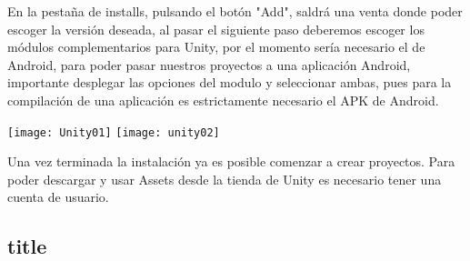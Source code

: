En la pestaña de installs, pulsando el botón "Add", saldrá una venta donde poder escoger la versión deseada, al pasar el siguiente paso deberemos escoger los módulos complementarios para Unity, por el momento sería necesario el de Android, para poder pasar nuestros proyectos a una aplicación Android, importante desplegar las opciones del modulo y seleccionar ambas, pues para la compilación de una aplicación es estrictamente necesario el APK de Android.

\texttt{[image: Unity01]}
\texttt{[image: unity02]}

Una vez terminada la instalación ya es posible comenzar a crear proyectos. 
Para poder descargar y usar Assets desde la tienda de Unity es necesario tener una cuenta de usuario.
\subsection{title}
